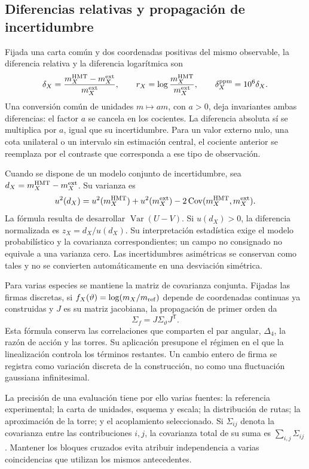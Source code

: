 \subsection{Diferencias relativas y propagación de incertidumbre}
\label{vi:subsec:vi-residuales}

Fijada una carta común y dos coordenadas positivas del mismo observable,
la diferencia relativa y la diferencia logarítmica son
\[
 \delta_X=\frac{m_X^{\rm HMT}-m_X^{\rm ext}}{m_X^{\rm ext}},
 \qquad r_X=\log\frac{m_X^{\rm HMT}}{m_X^{\rm ext}},
 \qquad \delta_X^{\rm ppm}=10^6\delta_X.
\]
Una conversión común de unidades \(m\mapsto am\), con \(a>0\),
deja invariantes ambas diferencias: el factor \(a\) se cancela en los
cocientes. La diferencia absoluta sí se multiplica por \(a\), igual que
su incertidumbre. Para un valor externo nulo, una cota unilateral o un
intervalo sin estimación central, el cociente anterior se reemplaza por
el contraste que corresponda a ese tipo de observación.

Cuando se dispone de un modelo conjunto de incertidumbre, sea
\(d_X=m_X^{\rm HMT}-m_X^{\rm ext}\). Su varianza es
\[
 u^2(d_X)=u^2(m_X^{\rm HMT})+u^2(m_X^{\rm ext})
          -2\operatorname{Cov}(m_X^{\rm HMT},m_X^{\rm ext}).
\]
La fórmula resulta de desarrollar
\(\operatorname{Var}(U-V)\). Si \(u(d_X)>0\), la diferencia
normalizada es \(z_X=d_X/u(d_X)\). Su interpretación estadística exige
el modelo probabilístico y la covarianza correspondientes; un campo no
consignado no equivale a una varianza cero. Las incertidumbres asimétricas
se conservan como tales y no se convierten automáticamente en una desviación
simétrica.

Para varias especies se mantiene la matriz de covarianza conjunta. Fijadas
las firmas discretas, si \(f_X(\vartheta)=\log(m_X/m_{\rm ref})\)
depende de coordenadas continuas ya construidas y \(J\) es su matriz
jacobiana, la propagación de primer orden da
\[
 \Sigma_f=J\Sigma_\vartheta J^{\mathsf T}.
\]
Esta fórmula conserva las correlaciones que comparten el par angular,
\(\Delta_4\), la razón de acción y las torres. Su aplicación presupone
el régimen en el que la linealización controla los términos restantes.
Un cambio entero de firma se registra como variación discreta de la
construcción, no como una fluctuación gaussiana infinitesimal.

La precisión de una evaluación tiene por ello varias fuentes: la
referencia experimental; la carta de unidades, esquema y escala; la
distribución de rutas; la aproximación de la torre; y el acoplamiento
seleccionado. Si \(\Sigma_{ij}\) denota la covarianza entre las
contribuciones \(i,j\), la covarianza total de su suma es
\(\sum_{i,j}\Sigma_{ij}\). Mantener los bloques cruzados evita
atribuir independencia a varias coincidencias que utilizan los mismos
antecedentes.

